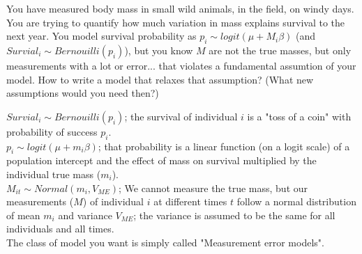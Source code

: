 \documentclass[12pt,a4paper]{scrartcl}\usepackage[]{graphicx}\usepackage[]{color}
\begin{document}
\begin{Exercise}[difficulty=2, title={Measurement error}]
  You have measured body mass in small wild animals, in the field, on windy days. You are trying to quantify how much variation in mass explains survival to the next year. You model survival probability as $p_i \sim logit(\mu + M_i\beta )$ (and $Survial_i \sim Bernouilli(p_i)$), but you know $M$ are not the true masses, but only measurements with a lot or error... that violates a fundamental assumtion of your model. How to write a model that relaxes that assumption? (What new assumptions would you need then?)
\end{Exercise}
\begin{Answer}
$Survial_i \sim Bernouilli(p_i)$; the survival of individual $i$ is a "toss of a coin" with probability of success $p_i$.\\
$p_i \sim logit(\mu + m_i\beta )$; that probability is a linear function (on a logit scale) of a population intercept and the effect of mass on survival multiplied by the individual true mass ($m_i$).\\
$M_{it} \sim Normal(m_i,V_{ME})$; We cannot measure the true mass, but our measurements ($M$) of individual $i$ at different times $t$ follow a normal distribution of mean $m_i$ and variance $V_{ME}$; the variance is assumed to be the same for all individuals and all times.\\

The class of model you want is simply called "Measurement error models". 
\end{Answer}
\end{document}
